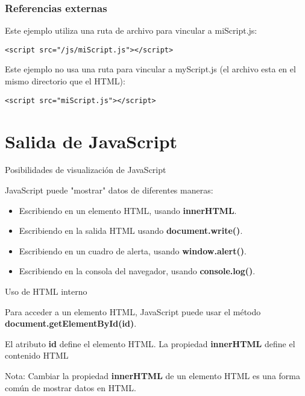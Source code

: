 \begin{frame}[fragile]
  \frametitle{Referencias externas}

  \vspace{\baselineskip}
  Este ejemplo utiliza una ruta de archivo para vincular a miScript.js:

  \vspace{\baselineskip}
  \begin{lstlisting}
<script src="/js/miScript.js"></script>
  \end{lstlisting}

  \vspace{\baselineskip}
  Este ejemplo no usa una ruta para vincular a myScript.js (el archivo esta
  en el mismo directorio que el HTML):

  \vspace{\baselineskip}
  \begin{lstlisting}
<script src="miScript.js"></script>
  \end{lstlisting}
\end{frame}

\section{Salida de JavaScript}

\begin{frame}[c]{Posibilidades de visualización de JavaScript}

  JavaScript puede "mostrar" datos de diferentes maneras:

  \vspace{\baselineskip}
  \begin{itemize}
    \item Escribiendo en un elemento HTML, usando \textbf{innerHTML}.
    \item Escribiendo en la salida HTML usando \textbf{document.write()}.
    \item Escribiendo en un cuadro de alerta, usando \textbf{window.alert()}.
    \item Escribiendo en la consola del navegador, usando
      \textbf{console.log()}.
  \end{itemize}
\end{frame}

\begin{frame}[c]{Uso de HTML interno}

  Para acceder a un elemento HTML, JavaScript puede usar el
  método \textbf{document.getElementById(id)}.

  \vspace{\baselineskip}
  El atributo \textbf{id} define el elemento HTML.
  La propiedad \textbf{innerHTML} define el contenido HTML

  \begin{exampleblock}{Nota:}
    Cambiar la propiedad \textbf{innerHTML} de un elemento HTML
    es una forma común de mostrar datos en HTML.
  \end{exampleblock}
\end{frame}

